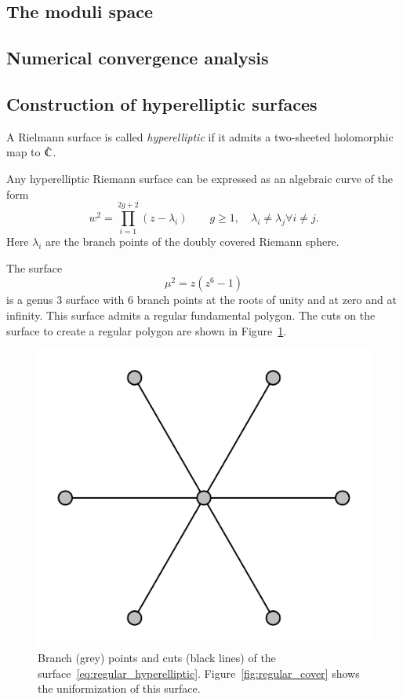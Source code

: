\documentclass[Thesis.tex]{subfiles}
\begin{document}
\subsection{The moduli space}
\subsection{Numerical convergence analysis}

\subsection{Construction of hyperelliptic surfaces}

\begin{definition}
	A Rielmann surface is called \emph{hyperelliptic} if it admits a two-sheeted holomorphic map to
$\hat{\mathbb C}$.
\end{definition}

Any hyperelliptic Riemann surface can be expressed as an algebraic curve of the form
\[ w^2 = \prod_{i=1}^{2g+2}(z-\lambda_i) \quad\quad g\geq1,\quad \lambda_i\neq \lambda_j \forall i\neq j.\]
Here $\lambda_i$ are the branch points of the doubly covered Riemann sphere.

\begin{example}
The surface 
\begin{equation}
	\label{eq:regular_hyperelliptic}
	\mu^2=z(z^6-1)
\end{equation} 
is a genus $3$ surface with $6$ branch points at the 
roots of unity and at zero and at infinity. This surface admits a regular fundamental polygon.
The cuts on the surface to create a regular polygon are shown in Figure~\ref{fig:regular_branchdata}.
\end{example}

\begin{figure}
\centering
\includegraphics[width=0.2\linewidth]{data/hyperelliptic_g3/curve}
\caption{Branch (grey) points and cuts (black lines) of the surface~\ref{eq:regular_hyperelliptic}.
Figure~\ref{fig:regular_cover} shows the uniformization of this surface.}
\label{fig:regular_branchdata}
\end{figure}
\end{document}
